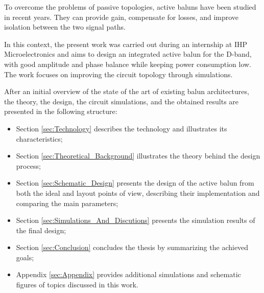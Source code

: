 To overcome the problems of passive topologies, active baluns have been studied in recent years. They can provide gain, compensate for losses, and improve isolation between the two signal paths.

In this context, the present work was carried out during an internship at IHP Microelectronics and aims to design an integrated active balun for the D-band, with good amplitude and phase balance while keeping power consumption low. The work focuses on improving the circuit topology through simulations.

After an initial overview of the state of the art of existing balun architectures, the theory, the design, the circuit simulations, and the obtained results are presented in the following structure:

\begin{itemize}
    \item Section \ref{sec:Technology} describes the technology and illustrates its characteristics;
    \item Section \ref{sec:Theoretical_Background} illustrates the theory behind the design process;
    \item Section \ref{sec:Schematic_Design} presents the design of the active balun from both the ideal and layout points of view, describing their implementation and comparing the main parameters;
    \item Section \ref{sec:Simulations_And_Discutions} presents the simulation results of the final design;
    \item Section \ref{sec:Conclusion} concludes the thesis by summarizing the achieved goals;
    \item Appendix \ref{sec:Appendix} provides additional simulations and schematic figures of topics discussed in this work.
\end{itemize}











